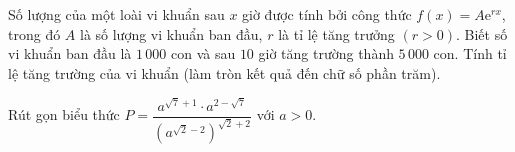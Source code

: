 \begin{ex}%
	Số lượng của một loài vi khuẩn sau $x$ giờ được tính bởi công thức $f(x)=A\mathrm{e}^{rx}$, trong đó
	$A$ là số lượng vi khuẩn ban đầu, $r$ là tỉ lệ tăng trưởng $(r>0)$. Biết số vi khuẩn ban đầu là $1\,000$
	con và sau $10$ giờ tăng trường thành $5\,000$ con. Tính tỉ lệ tăng trường của vi khuẩn (làm tròn kết quả đến
	chữ số phần trăm).
\end{ex}

\begin{ex} %
	Rút gọn biểu thức $P=\dfrac{a^{\sqrt{7}+1}\cdot a^{2-\sqrt{7}}}{\left(a^{\sqrt{2}-2}\right)^{\sqrt{2}+2}}$ với $a>0$.
\end{ex}

